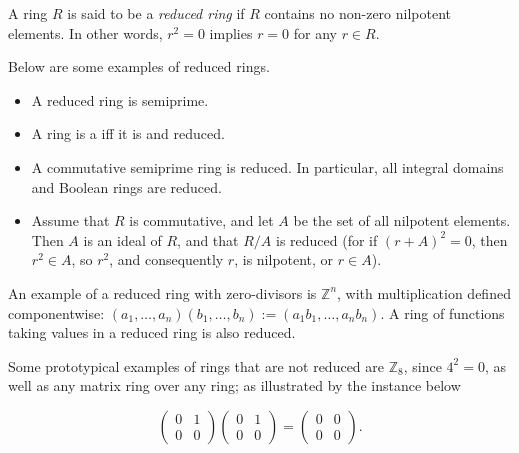 \documentclass[12pt]{article}
\begin{document}

A ring $R$ is said to be a {\it reduced ring} if $R$ contains no non-zero nilpotent elements.  In other words, $r^2=0$ implies $r=0$ for any $r\in R$.

Below are some examples of reduced rings.

\begin{itemize}
\item A reduced ring is semiprime.

\item A ring is a  iff it is  and reduced.

\item A commutative semiprime ring is reduced.  In particular, all integral domains and Boolean rings are reduced.

\item Assume that $R$ is commutative, and let $A$ be the set of all nilpotent elements.  Then $A$ is an ideal of $R$, and that $R/A$ is reduced (for if $(r+A)^2=0$, then $r^2\in A$, so $r^2$, and consequently $r$, is nilpotent, or $r\in A$).

\end{itemize}

An example of a reduced ring with zero-divisors is $\mathbb{Z}^n$, with multiplication defined componentwise: $(a_1,\ldots,a_n)(b_1,\ldots,b_n):=(a_1b_1,\ldots, a_nb_n)$.  A ring of functions taking values in a reduced ring is also reduced.

Some prototypical examples of rings that are not reduced are $\mathbb{Z}_8$, since $4^2=0$, as well as any matrix ring over any ring; as illustrated by the instance below

$$
\begin{pmatrix}
0 & 1 \\
0 & 0 
\end{pmatrix}
\begin{pmatrix}
0 & 1 \\
0 & 0
\end{pmatrix}
=
\begin{pmatrix}
0 & 0 \\
0 & 0
\end{pmatrix}.
$$
\end{document}
